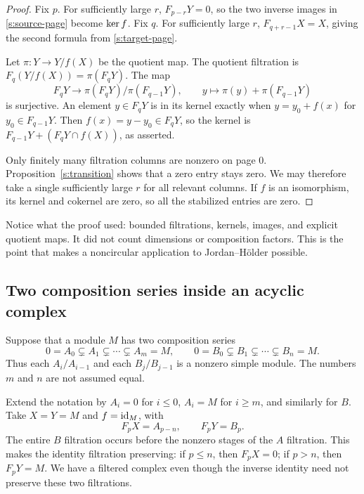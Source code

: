 \begin{proof}
Fix $p$. For sufficiently large $r$, $F_{p-r}Y=0$, so the two inverse
images in \eqref{s:source-page} become $\operatorname{ker} f$. Fix $q$. For sufficiently
large $r$, $F_{q+r-1}X=X$, giving the second formula from
\eqref{s:target-page}.

Let $\pi:Y\to Y/f(X)$ be the quotient map. The quotient filtration is
$F_q(Y/f(X))=\pi(F_qY)$. The map
\[
F_qY\longrightarrow\pi(F_qY)/\pi(F_{q-1}Y),\qquad
y\longmapsto\pi(y)+\pi(F_{q-1}Y)
\]
is surjective. An element $y\in F_qY$ is in its kernel exactly when
$y=y_0+f(x)$ for $y_0\in F_{q-1}Y$. Then $f(x)=y-y_0\in F_qY$,
so the kernel is $F_{q-1}Y+(F_qY\cap f(X))$, as asserted.

Only finitely many filtration columns are nonzero on page $0$.
Proposition~\ref{s:transition} shows that a zero entry stays zero.
We may therefore take a single sufficiently large $r$ for all relevant
columns. If $f$ is an isomorphism, its kernel and cokernel are zero,
so all the stabilized entries are zero.
\end{proof}

Notice what the proof used: bounded filtrations, kernels, images, and
explicit quotient maps. It did not count dimensions or composition
factors. This is the point that makes a noncircular application to
Jordan--H\"older possible.

\subsection{Two composition series inside an acyclic complex}

Suppose that a module $M$ has two composition series
\[
0=A_0\subsetneq A_1\subsetneq\cdots\subsetneq A_m=M,
\qquad
0=B_0\subsetneq B_1\subsetneq\cdots\subsetneq B_n=M.
\]
Thus each $A_i/A_{i-1}$ and each $B_j/B_{j-1}$ is a nonzero simple
module. The numbers $m$ and $n$ are not assumed equal.

Extend the notation by $A_i=0$ for $i\leq0$, $A_i=M$ for $i\geq m$,
and similarly for $B$. Take $X=Y=M$ and $f=\mathrm{id}_M$, with
\begin{equation}\label{s:staggered-filtrations}
F_pX=A_{p-n},\qquad F_pY=B_p.
\end{equation}
The entire $B$ filtration occurs before the nonzero stages of the
$A$ filtration. This makes the identity filtration preserving:
if $p\leq n$, then $F_pX=0$; if $p>n$, then $F_pY=M$.
We have a filtered complex even though the inverse identity need not
preserve these two filtrations.

